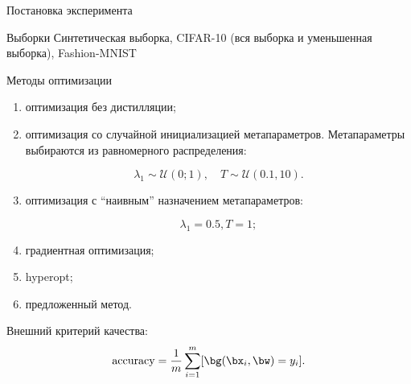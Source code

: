 \documentclass[12pt, aspectratio=169]{beamer}
\begin{document}
\begin{frame}{Постановка эксперимента}
    

\vspace{-0.35 cm}
\begin{block}{Выборки}
    Синтетическая выборка, CIFAR-10 (вся выборка и уменьшенная выборка), Fashion-MNIST
\end{block}

\vspace{-0.2 cm}
\begin{block}{Методы оптимизации}
\fontsize{11}{5}\selectfont
\begin{enumerate}[{1)}]
    \item оптимизация без дистилляции;
    \item оптимизация со случайной инициализацией метапараметров. Метапараметры выбираются из равномерного распределения:
    
    \vspace{-0.1 cm}
    
    $$\lambda_1 \sim \mathcal{U}(0;1), \quad T \sim \mathcal{U}(0.1, 10).$$
    
    \vspace{-0.3 cm}
    
    \item оптимизация с ``наивным'' назначением метапараметров:
    
    \vspace{-0.1 cm}
    
    $$\lambda_1 = 0.5, T = 1;$$
    
    \vspace{-0.3 cm}
    
    \item градиентная оптимизация;
    \item hyperopt;
    \item предложенный метод.
\end{enumerate}
\end{block}
    
\fontsize{11}{5}\selectfont
\vspace{-0.1 cm}
Внешний критерий качества:
\vspace{-0.4 cm}
\begin{equation*}
    \text{accuracy} = \frac{1}{m}\sum\limits_{i=1}^m [\bg(\bx_i, \bw) = y_i].
\end{equation*}
    
\end{frame}
\end{document}
